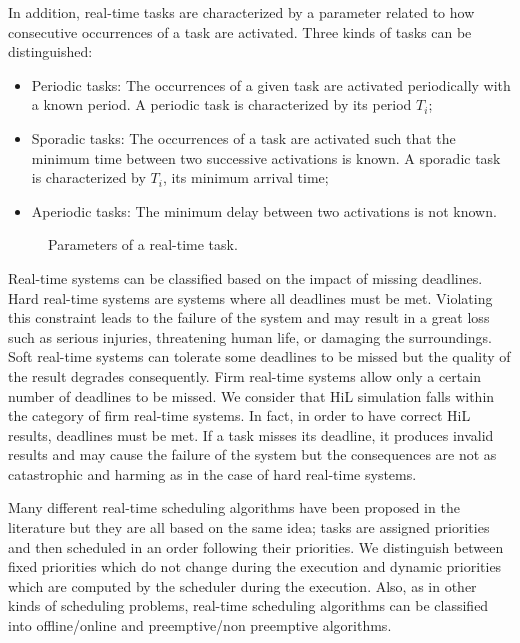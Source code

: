 In addition, real-time tasks are characterized by a parameter related to how consecutive occurrences of a task are activated. Three kinds of tasks can be distinguished:
\begin{itemize}
\item Periodic tasks: The occurrences of a given task are activated periodically with a known period. A periodic task is characterized by its period $T_i$;
\item Sporadic tasks: The occurrences of a task are activated such that the minimum time between two successive activations is known. A sporadic task is characterized by $T_i$, its minimum arrival time;
\item Aperiodic tasks: The minimum delay between two activations is not known.
\end{itemize} 

\begin{figure}[phbt]
\centering

\caption{Parameters of a real-time task.}
\label{fig:taskmodel}
\end{figure} 

Real-time systems can be classified based on the impact of missing deadlines. Hard real-time systems are systems where all deadlines must be met. Violating this constraint leads to the failure of the system and may result in a great loss such as serious injuries, threatening human life, or damaging the surroundings. Soft real-time systems can tolerate some deadlines to be missed but the quality of the result degrades consequently. Firm real-time systems allow only a certain number of deadlines to be missed. We consider that HiL simulation falls within the category of firm real-time systems. In fact, in order to have correct HiL results, deadlines must be met. If a task misses its deadline, it produces invalid results and may cause the failure of the system but the consequences are not as catastrophic and harming as in the case of hard real-time systems.   

Many different real-time scheduling algorithms have been proposed in the literature but they are all based on the same idea; tasks are assigned priorities and then scheduled in an order following their priorities. We distinguish between fixed priorities which do not change during the execution and dynamic priorities which are computed by the scheduler during the execution. Also, as in other kinds of scheduling problems, real-time scheduling algorithms can be classified into offline/online and preemptive/non preemptive algorithms.

